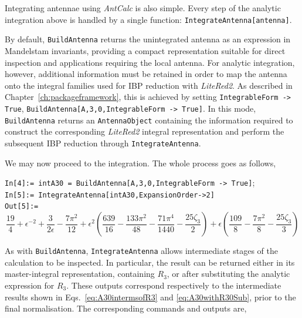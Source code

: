 Integrating antennae using \textit{AntCalc} is also simple. Every step of the analytic integration above is handled by a single function: \texttt{IntegrateAntenna[antenna]}.

By default, \texttt{BuildAntenna} returns the unintegrated antenna as an expression in Mandelstam
invariants, providing a compact representation suitable for direct inspection and applications
requiring the local antenna. For analytic integration, however, additional information must be
retained in order to map the antenna onto the integral families used for IBP reduction with
\textit{LiteRed2}. As described in Chapter~\ref{ch:packageframework}, this is achieved by setting
\texttt{IntegrableForm -> True}, \texttt{BuildAntenna[A,3,0,IntegrableForm -> True]}. In this mode,
\texttt{BuildAntenna} returns an \texttt{AntennaObject} containing the information required to
construct the corresponding \textit{LiteRed2} integral representation and perform the subsequent IBP
reduction through \texttt{IntegrateAntenna}.

We may now proceed to the integration. The whole process goes as follows,

\begin{mdframed}[backgroundcolor=gray!10, linewidth=0pt]
    \texttt{In[4]:= intA30 = BuildAntenna[A,3,0,IntegrableForm -> True]};\\
    \hfill
    \texttt{In[5]:= IntegrateAntenna[intA30,ExpansionOrder->2]}\\
    \hfill
    \texttt{Out[5]:=}
        \begin{equation*}
            \frac{19}{4}+\epsilon^{-2}+\frac3{2\epsilon}-\frac{7\pi^2}{12}+\epsilon^2\left(\frac{639}{16}-\frac{133\pi^2}{48}-\frac{71\pi^4}{1440}-\frac{25\zeta_3}{2}\right)+\epsilon\left(\frac{109}{8}-\frac{7\pi^2}{8}-\frac{25\zeta_3}{3}\right)
        \end{equation*}
\end{mdframed}

As with \texttt{BuildAntenna}, \texttt{IntegrateAntenna} allows intermediate stages of the calculation
to be inspected. In particular, the result can be returned either in its master-integral
representation, containing $R_3$, or after substituting the analytic expression for $R_3$. These
outputs correspond respectively to the intermediate results shown in
Eqs.~\eqref{eq:A30intermsofR3} and \eqref{eq:A30withR30Sub}, prior to the final normalisation. The
corresponding commands and outputs are,

